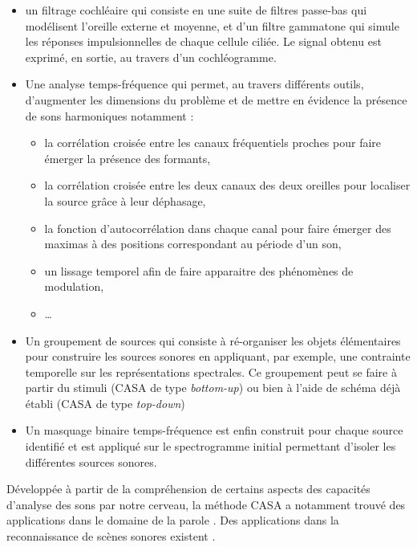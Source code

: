 \begin{itemize}
\item un filtrage cochléaire qui consiste en une suite de filtres passe-bas qui modélisent l'oreille externe et moyenne, et d'un filtre gammatone qui simule les réponses impulsionnelles de chaque cellule ciliée. Le signal obtenu est exprimé, en sortie, au travers d'un cochléogramme.
\item Une analyse temps-fréquence qui permet, au travers différents outils, d'augmenter les dimensions du problème et de mettre en évidence la présence de sons harmoniques notamment :
\begin{itemize}[label=$\bullet$]
\item la corrélation croisée entre les canaux fréquentiels proches pour faire émerger la présence des formants,
\item la corrélation croisée entre les deux canaux des deux oreilles pour localiser la source grâce à leur déphasage,
\item la fonction d'autocorrélation dans chaque canal pour faire émerger des maximas à des positions correspondant au période d'un son,
\item un lissage temporel afin de faire apparaitre des phénomènes de modulation,
\item \dots
\end{itemize}
\item Un groupement de sources qui consiste à ré-organiser les objets élémentaires pour construire les sources sonores en appliquant, par exemple, une contrainte temporelle  sur les représentations spectrales. Ce groupement peut se faire à partir du stimuli (CASA de type \textit{bottom-up}) ou bien à l'aide de schéma déjà établi (CASA de type \textit{top-down})
\item Un masquage binaire temps-fréquence est enfin construit pour chaque source identifié et est appliqué sur le spectrogramme initial permettant d'isoler les différentes sources sonores.\\
\end{itemize}

Développée à partir de la compréhension de certains aspects des capacités d'analyse des sons par notre cerveau, la méthode CASA a notamment trouvé des applications dans le domaine de la parole \cite{ellis1999using, brown2005separation, shao2010computational}. Des applications dans la reconnaissance de scènes sonores existent \cite{peltonen2002computational}. %

